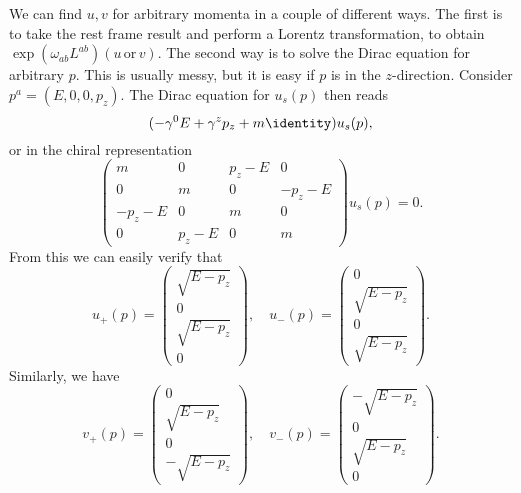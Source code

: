 \documentclass{jknotes} %
\begin{document}
We can find \(u,v\) for arbitrary momenta in a couple of different ways. The first is to take the rest frame result and perform a Lorentz transformation, to obtain \(\exp(\omega_{ab}L^{ab})(u\,\text{or}\,v)\). The second way is to solve the Dirac equation for arbitrary \(p\). This is usually messy, but it is easy if \(p\) is in the \(z\)-direction. Consider \(p^a = (E,0,0,p_z)\). The Dirac equation for \(u_s(p)\) then reads
\begin{equation}
    (-\gamma^0E+\gamma^zp_z + m\identity)u_s(p),
\end{equation}
or in the chiral representation
\begin{equation}
    \begin{pmatrix}
        m & 0 & p_z-E & 0 \\
        0 & m & 0 & -p_z-E \\
        -p_z-E & 0 & m & 0 \\
        0 & p_z-E & 0 & m
    \end{pmatrix}
    u_s(p) = 0.
\end{equation}
From this we can easily verify that
\begin{equation}
    u_+(p) = 
    \begin{pmatrix}
        \sqrt{E-p_z} \\ 0 \\ \sqrt{E-p_z} \\ 0
    \end{pmatrix}
    ,\quad
    u_-(p) = 
    \begin{pmatrix}
        0 \\ \sqrt{E-p_z} \\ 0 \\ \sqrt{E-p_z}
    \end{pmatrix}.
\end{equation}
Similarly, we have
\begin{equation}
    v_+(p) = 
    \begin{pmatrix}
        0 \\ \sqrt{E-p_z} \\ 0 \\ -\sqrt{E-p_z}
    \end{pmatrix}
    ,\quad
    v_-(p) = 
    \begin{pmatrix}
        -\sqrt{E-p_z} \\ 0 \\ \sqrt{E-p_z} \\ 0
    \end{pmatrix}.
\end{equation}
\end{document}
